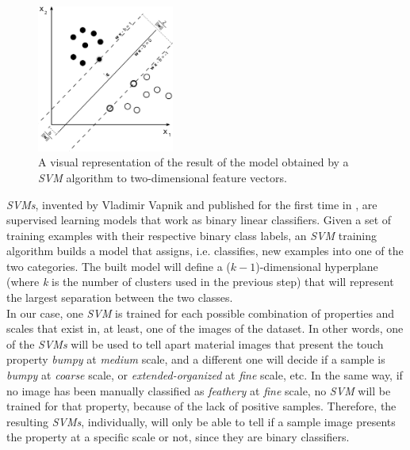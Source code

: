 \begin{figure}
    \centering
    \includegraphics[width=0.4\textwidth, trim=0 0 0 0, clip]
                    {Images/SVMs.png}
    \caption{A visual representation\protect\footnotemark\xspace of the result of the model obtained by a \emph{SVM} algorithm to two-dimensional feature vectors.}
    \label{}
\end{figure}


\emph{SVMs}, invented by Vladimir Vapnik and published for the first time in \cite{Vapnik_1995_SVMs}, are supervised learning models that work as binary linear classifiers. Given a set of training examples with their respective binary class labels, an \emph{SVM} training algorithm builds a model that assigns, i.e. classifies, new examples into one of the two categories. The built model will define a ($k-1$)-dimensional hyperplane (where \emph{k} is the number of clusters used in the previous step) that will represent the largest separation between the two classes. \\

In our case, one \emph{SVM} is trained for each possible combination of properties and scales that exist in, at least, one of the images of the dataset. In other words, one of the \emph{SVMs} will be used to tell apart material images that present the touch property \emph{bumpy} at \emph{medium} scale, and a different one will decide if a sample is \emph{bumpy} at \emph{coarse} scale, or \emph{extended-organized} at \emph{fine} scale, etc. In the same way, if no image has been manually classified as \emph{feathery} at \emph{fine} scale, no \emph{SVM} will be trained for that property, because of the lack of positive samples. Therefore, the resulting \emph{SVMs}, individually, will only be able to tell if a sample image presents the property at a specific scale or not, since they are binary classifiers. \\

